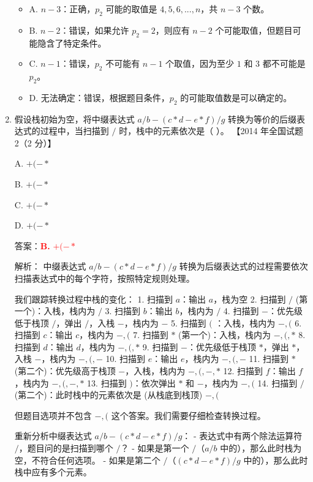 \documentclass[lang=cn,newtx,10pt,scheme=chinese]{../../../elegantbook}
\begin{document}
\begin{enumerate}
    \begin{itemize}
        \item A. $n-3$：正确，$p_2$ 可能的取值是 $4, 5, 6, ..., n$，共 $n-3$ 个数。
        \item B. $n-2$：错误，如果允许 $p_2 = 2$，则应有 $n-2$ 个可能取值，但题目可能隐含了特定条件。
        \item C. $n-1$：错误，$p_2$ 不可能有 $n-1$ 个取值，因为至少 $1$ 和 $3$ 都不可能是 $p_2$。
        \item D. 无法确定：错误，根据题目条件，$p_2$ 的可能取值数是可以确定的。
    \end{itemize}

    \item 假设栈初始为空，将中缀表达式 $a/b-(c*d-e*f)/g$ 转换为等价的后缀表达式的过程中，当扫描到 $/$ 时，栈中的元素依次是（ ）。  
    【2014 年全国试题 2（2 分）】  

    A. $+ ( - *$  

    B. $+ ( - *$  

    C. $+ ( - *$  

    D. $+ ( - *$  

    答案：\textcolor{red}{\textbf{B.} $+ ( - *$}

    解析：
    中缀表达式 $a/b-(c*d-e*f)/g$ 转换为后缀表达式的过程需要依次扫描表达式中的每个字符，按照特定规则处理。

    我们跟踪转换过程中栈的变化：
    1. 扫描到 $a$：输出 $a$，栈为空
    2. 扫描到 $/$ (第一个)：入栈，栈内为 $/$
    3. 扫描到 $b$：输出 $b$，栈内为 $/$
    4. 扫描到 $-$：优先级低于栈顶 $/$，弹出 $/$，入栈 $-$，栈内为 $-$
    5. 扫描到 $($ ：入栈，栈内为 $-,($
    6. 扫描到 $c$：输出 $c$，栈内为 $-,($
    7. 扫描到 $*$ (第一个)：入栈，栈内为 $-,(,*$
    8. 扫描到 $d$：输出 $d$，栈内为 $-,(,*$
    9. 扫描到 $-$：优先级低于栈顶 $*$，弹出 $*$，入栈 $-$，栈内为 $-,(,-$
    10. 扫描到 $e$：输出 $e$，栈内为 $-,(,-$
    11. 扫描到 $*$ (第二个)：优先级高于栈顶 $-$，入栈，栈内为 $-,(,-,*$
    12. 扫描到 $f$：输出 $f$，栈内为 $-,(,-,*$
    13. 扫描到 $)$：依次弹出 $*$ 和 $-$，栈内为 $-,($
    14. 扫描到 $/$ (第二个)：此时栈中的元素依次是 (从栈底到栈顶) $-,($

    但题目选项并不包含 $-,($ 这个答案。我们需要仔细检查转换过程。

    重新分析中缀表达式 $a/b-(c*d-e*f)/g$：
    - 表达式中有两个除法运算符 $/$，题目问的是扫描到哪个 $/$？
    - 如果是第一个 $/$（$a/b$ 中的），那么此时栈为空，不符合任何选项。
    - 如果是第二个 $/$（$(c*d-e*f)/g$ 中的），那么此时栈中应有多个元素。


\end{enumerate}
\end{document}
